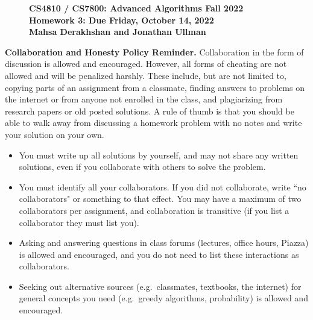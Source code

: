 \documentclass[11pt]{article}
\theoremstyle{definition}
\newcommand{\HWtitle}[2]{\begin{figure}[t!]{\bfseries \Large \color{DarkBlue}  \noindent CS4810 / CS7800: Advanced Algorithms \hfill Fall 2022} \\[0.2em] {\bfseries \Large \color{DarkBlue} Homework #1: Due {#2}} \\[1em] {\bfseries \large Mahsa Derakhshan and Jonathan Ullman}\\[1ex] \end{figure}}
\begin{document}

\HWtitle{3}{Friday, October 14, 2022}


\noindent
\textbf{Collaboration and Honesty Policy Reminder.}
Collaboration in the form of discussion is allowed and encouraged. However, all forms of cheating are not allowed and will be penalized harshly.  These include, but are not limited to, copying parts of an assignment from a classmate, finding answers to problems on the internet or from anyone not enrolled in the class, and plagiarizing from research papers or old posted solutions.  A rule of thumb is that you should be able to walk away from discussing a homework problem with no notes and write your solution on your own.

\begin{itemize}[itemsep=1pt]
	\item You must write up all solutions by yourself, and may not share any written solutions, even if you collaborate with others to solve the problem.
	
	\item You must identify all your collaborators. If you did not collaborate, write ``no collaborators" or something to that effect. You may have a maximum of two collaborators per assignment, and collaboration is transitive (if you list a collaborator they must list you).
	
	\item Asking and answering questions in class forums (lectures, office hours, Piazza) is allowed and encouraged, and you do not need to list these interactions as collaborators.
	
	\item Seeking out alternative sources (e.g.\ classmates, textbooks, the internet) for general concepts you need (e.g.\ greedy algorithms, probability) is allowed and encouraged.
\end{itemize}
\medskip

\renewcommand{\labelenumii}{{\bfseries \em \arabic{enumi}.\arabic{enumii}}}
\newcommand{\problemitem}{\renewcommand{\labelenumi}{{\bfseries \em Problem \arabic{enumi}}}\item}
\newcommand{\solutionitem}{\renewcommand{\labelenumi}{{\bfseries \em Solution \arabic{enumi}}}\addtocounter{enumi}{-1}\item}
\end{document}
